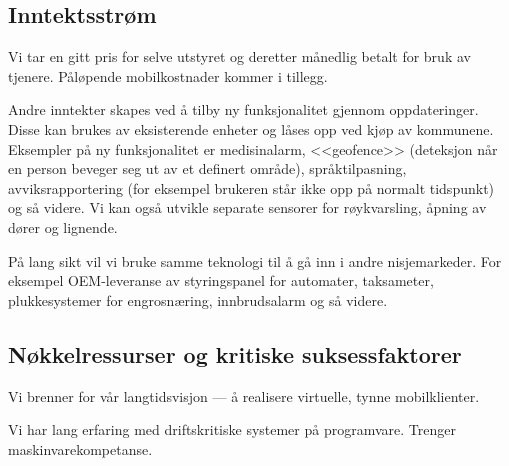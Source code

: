 \subsection{Inntektsstrøm}


Vi tar en gitt pris for selve utstyret og deretter månedlig betalt for bruk av
tjenere. Påløpende mobilkostnader kommer i tillegg.

Andre inntekter skapes ved å tilby ny funksjonalitet gjennom oppdateringer.
Disse kan brukes av eksisterende enheter og låses opp ved kjøp av kommunene.
Eksempler på ny funksjonalitet er medisinalarm, <<geofence>> (deteksjon når en
person beveger seg ut av et definert område), språktilpasning,
avviksrapportering (for eksempel brukeren står ikke opp på normalt tidspunkt)
og så videre. Vi kan også utvikle separate sensorer for røykvarsling, åpning av
dører og lignende.

På lang sikt vil vi bruke samme teknologi til å gå inn i andre nisjemarkeder.
For eksempel OEM-leveranse av styringspanel for automater, taksameter,
plukkesystemer for engrosnæring, innbrudsalarm og så videre.

\subsection{Nøkkelressurser og kritiske suksessfaktorer}



Vi brenner for vår langtidsvisjon --- å realisere virtuelle, tynne
mobilklienter.

Vi har lang erfaring med driftskritiske systemer på programvare. Trenger
maskinvarekompetanse.%


